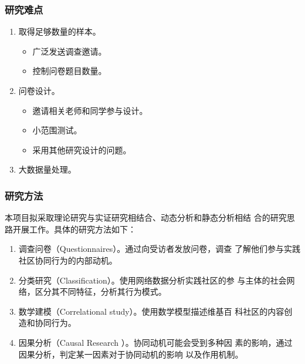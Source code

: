 \documentclass[slidestop,compress,mathserif,blue,compress]{beamer}
\begin{document}
\begin{frame}
  \frametitle{研究难点}
\vfill
  \begin{enumerate}
\item 取得足够数量的样本。
  \begin{itemize}
  \item 广泛发送调查邀请。
   \item 控制问卷题目数量。
  \end{itemize}
\item  问卷设计。
  \begin{itemize}
  \item  邀请相关老师和同学参与设计。
  \item 小范围测试。
   \item  采用其他研究设计的问题。
  \end{itemize}
\item  大数据量处理。

\end{enumerate}
\vfill
\end{frame}
\begin{frame}
  \frametitle{研究方法}
  \vfill
本项目拟采取理论研究与实证研究相结合、动态分析和静态分析相结
合的研究思路开展工作。具体的研究方法如下：
\begin{enumerate}
\item  调查问卷（Questionnaires）。通过向受访者发放问卷，调查
            了解他们参与实践社区协同行为的内部动机。
\item 分类研究（Classification）。使用网络数据分析实践社区的参
            与主体的社会网络，区分其不同特征，分析其行为模式。
\item 数学建模（Correlational study）。使用数学模型描述维基百
            科社区的内容创造和协同行为。
\item 因果分析（Causal Research ）。协同动机可能会受到多种因
            素的影响，通过因果分析，判定某一因素对于协同动机的影响
            以及作用机制。
\end{enumerate}
\vfill
\end{frame}
\end{document}
